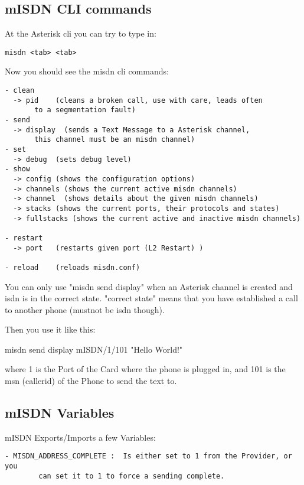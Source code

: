 \subsection{mISDN CLI commands}

At the Asterisk cli you can try to type in:

\begin{verbatim}
misdn <tab> <tab>
\end{verbatim}

Now you should see the misdn cli commands:

\begin{astlisting}
\begin{verbatim}
- clean
  -> pid    (cleans a broken call, use with care, leads often
       to a segmentation fault)
- send
  -> display  (sends a Text Message to a Asterisk channel,
       this channel must be an misdn channel)
- set
  -> debug  (sets debug level)
- show
  -> config (shows the configuration options)
  -> channels (shows the current active misdn channels)
  -> channel  (shows details about the given misdn channels)
  -> stacks (shows the current ports, their protocols and states)
  -> fullstacks (shows the current active and inactive misdn channels)

- restart
  -> port   (restarts given port (L2 Restart) )

- reload    (reloads misdn.conf)
\end{verbatim}
\end{astlisting}

You can only use "misdn send display" when an Asterisk channel is created and
isdn is in the correct state. "correct state" means that you have established a
call to another phone (mustnot be isdn though).

Then you use it like this:

misdn send display mISDN/1/101 "Hello World!"

where 1 is the Port of the Card where the phone is plugged in, and 101 is the
msn (callerid) of the Phone to send the text to.

\subsection{mISDN Variables}

mISDN Exports/Imports a few Variables:

\begin{verbatim}
- MISDN_ADDRESS_COMPLETE :  Is either set to 1 from the Provider, or you
        can set it to 1 to force a sending complete.
\end{verbatim}


